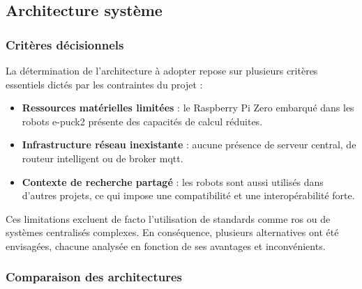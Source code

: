 \subsection{Architecture système} \label{sec:architecture_système}

\subsubsection{Critères décisionnels}
La détermination de l'architecture à adopter repose sur plusieurs critères essentiels dictés par les contraintes du projet :
\begin{itemize}
    \item \textbf{Ressources matérielles limitées} : le Raspberry Pi Zero embarqué dans les robots e-puck2 présente des capacités de calcul réduites.
    
    \item \textbf{Infrastructure réseau inexistante} : aucune présence de serveur central, de routeur intelligent ou de broker \acrfull{mqtt}.
    
    \item \textbf{Contexte de recherche partagé} : les robots sont aussi utilisés dans d'autres projets, ce qui impose une compatibilité et une interopérabilité forte.
\end{itemize}

Ces limitations excluent de facto l'utilisation de standards comme \acrfull{ros} ou de systèmes centralisés complexes. 
En conséquence, plusieurs alternatives ont été envisagées, chacune analysée en fonction de ses avantages et inconvénients.

\subsubsection{Comparaison des architectures}

